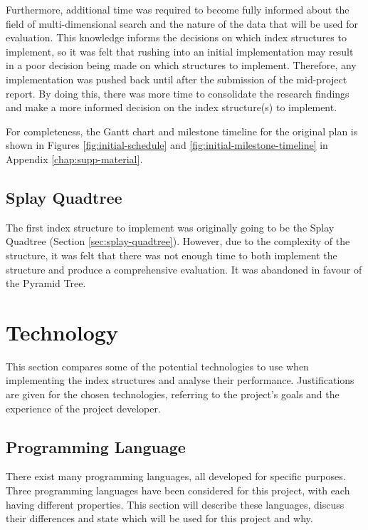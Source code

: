 Furthermore, additional time was required to become fully informed about the field of multi-dimensional search and the nature of the data that will be used for evaluation. This knowledge informs the decisions on which index structures to implement, so it was felt that rushing into an initial implementation may result in a poor decision being made on which structures to implement. Therefore, any implementation was pushed back until after the submission of the mid-project report. By doing this, there was more time to consolidate the research findings and make a more informed decision on the index structure(s) to implement.

For completeness, the Gantt chart and milestone timeline for the original plan is shown in Figures \ref{fig:initial-schedule} and \ref{fig:initial-milestone-timeline} in Appendix \ref{chap:supp-material}.

\subsection{Splay Quadtree}

The first index structure to implement was originally going to be the Splay Quadtree (Section \ref{sec:splay-quadtree}). However, due to the complexity of the structure, it was felt that there was not enough time to both implement the structure and produce a comprehensive evaluation. It was abandoned in favour of the Pyramid Tree.

\section{Technology}

This section compares some of the potential technologies to use when implementing the index structures and analyse their performance. Justifications are given for the chosen technologies, referring to the project's goals and the experience of the project developer.

\subsection{Programming Language}

There exist many programming languages, all developed for specific purposes. Three programming languages have been considered for this project, with each having different properties. This section will describe these languages, discuss their differences and state which will be used for this project and why.

